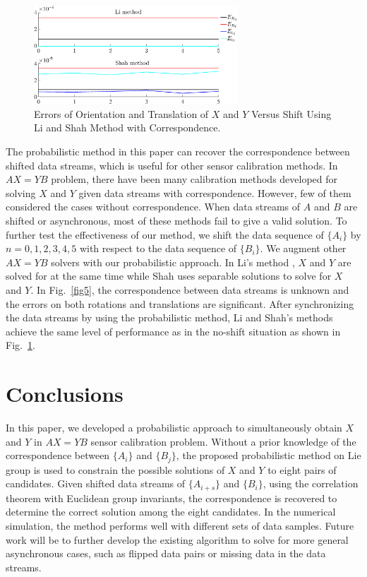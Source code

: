 \documentclass[letterpaper, 10 pt, conference]{ieeeconf}  %
\begin{document}
\begin{center}
\begin{figure}
\centering
\includegraphics[width=3in]{fig6.eps}
\caption{
Errors of Orientation and Translation of $X$ and $Y$ Versus Shift Using Li and Shah Method with Correspondence.
}
\label{fig6}
\end{figure}
\end{center}
The probabilistic method in this paper can recover the correspondence between shifted data streams, which is useful for other sensor calibration methods. In $AX=YB$ problem, there have been many calibration methods developed for solving $X$ and $Y$ given data streams with correspondence. However, few of them considered the cases without correspondence. When data streams of ${A}$ and ${B}$ are shifted or asynchronous, most of these methods fail to give a valid solution. To further test the effectiveness of our method, we shift the data sequence of $\{A_i\}$ by $n=0,1,2,3,4,5$ with respect to the data sequence of $\{B_i\}$. We augment other $AX=YB$ solvers with our probabilistic approach. In Li's method \cite{Li2010}, $X$ and $Y$ are solved for at the same time while Shah \cite{Shah2013} uses separable solutions to solve for $X$ and $Y$. In Fig.~\ref{fig5}, the correspondence between data streams is unknown and the errors on both rotations and translations are significant. After synchronizing the data streams by using the probabilistic method, Li and Shah's methods achieve the same level of performance as in the no-shift situation as shown in Fig.~\ref{fig6}.

\section{Conclusions}
\label{sect5}

In this paper, we developed a probabilistic approach to simultaneously obtain  $X$ and $Y$ in $AX=YB$ sensor calibration problem. Without a prior knowledge of the correspondence between $\{A_i\}$ and $\{B_j\}$, the proposed probabilistic method on Lie group is used to constrain the possible solutions of $X$ and $Y$ to eight pairs of candidates. Given shifted data streams of $\{A_{i+s}\}$ and $\{B_i\}$, using the correlation theorem with Euclidean group invariants, the correspondence is recovered to determine the correct solution among the eight candidates. In the numerical simulation, the method performs well with different sets of data samples. Future work will be to further develop the existing algorithm to solve for more general asynchronous cases, such as flipped data pairs or missing data in the data streams.
\end{document}
